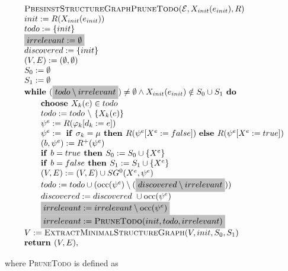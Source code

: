 \documentclass{article}
\newcommand{\Space}{\text{\ }}
\newcommand{\If}{\text{\textbf{if }}}
\newcommand{\Do}{\text{\textbf{ do }}}
\newcommand{\Then}{\text{\textbf{ then }}}
\newcommand{\Else}{\text{\textbf{else }}}
\newcommand{\While}{\text{\textbf{while }}}
\newcommand{\Choose}{\text{\textbf{choose }}}
\newcommand{\Return}{\text{\textbf{return }}}
\begin{document}
\begin{equation*}
\begin{array}{l}
\textsc{PbesinstStructureGraphPruneTodo}(\mathcal{E}, X_{init}(e_{init}), R) \\ 
init:=R(X_{init}(e_{init})) \\
todo:=\{init\} \\
\colorbox{lightgray}{$irrelevant := \emptyset$} \\
discovered:=\{init\} \\
(V,E) :=(\emptyset ,\emptyset ) \\ 
S_0:= \emptyset \\
S_1:= \emptyset \\
\While (\colorbox{lightgray}{$todo \setminus irrelevant$}) \neq \emptyset
\wedge X_{init}(e_{init}) \notin S_0 \cup S_1
\Do \\ 
\qquad \Choose X_{k}(e)\in todo \\ 
\qquad todo:=todo\ \backslash \ \{X_{k}(e)\} \\ 
\qquad \psi ^{e}:=R(\varphi _{k}[d_{k}:=e]) \\ 
\qquad \psi^e := \Space \If \sigma_k = \mu \Then R(\psi^e[X^e := false])
\Space \Else R(\psi^e[X^e := true]) \\
\qquad (b,\psi^e) := R^+(\psi^e) \\
\qquad \If b = true \Then S_0 := S_0 \cup \{ X^e \} \\
\qquad \If b = false \Then S_1 := S_1 \cup \{ X^e \} \\
\qquad (V,E) := (V,E) \cup SG^{0}(X^{e},\psi ^{e}) \\ 
\qquad todo := todo\cup (\mathrm{occ}(\psi ^{e})\setminus (\colorbox{lightgray}{$discovered \setminus irrelevant$})) \\
\qquad discovered := discovered\ \cup \mathrm{occ}(\psi^e) \\
\qquad \colorbox{lightgray}{$irrelevant := irrelevant \setminus \mathrm{occ}(\psi^e)$} \\
\qquad \colorbox{lightgray}{$irrelevant := \textsc{PruneTodo}(init, todo, irrelevant) $}\\
V := \textsc{ExtractMinimalStructureGraph}(V, init, S_0, S_1) \\
\Return(V, E),
\end{array}
\end{equation*}

where \textsc{PruneTodo} is defined as
\end{document}
